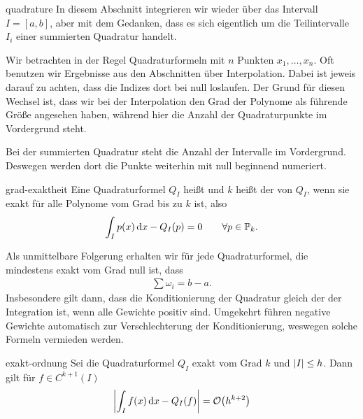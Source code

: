 \begin{Notation}{quadrature}
  In diesem Abschnitt integrieren wir wieder über das Intervall
  $I=[a,b]$, aber mit dem Gedanken, dass es sich eigentlich um die
  Teilintervalle $I_i$ einer summierten Quadratur handelt.

  Wir betrachten in der Regel Quadraturformeln mit $n$ Punkten
  $x_1,\dots,x_n$. Oft benutzen wir Ergebnisse aus den Abschnitten
  über Interpolation. Dabei ist jeweis darauf zu achten, dass die
  Indizes dort bei null loslaufen. Der Grund für diesen Wechsel ist,
  dass wir bei der Interpolation den Grad der Polynome als führende
  Größe angesehen haben, während hier die Anzahl der Quadraturpunkte
  im Vordergrund steht.

  Bei der summierten Quadratur steht die Anzahl der Intervalle im
  Vordergrund. Deswegen werden dort die Punkte weiterhin mit null
  beginnend numeriert.
\end{Notation}

\begin{Definition}{grad-exaktheit}
  Eine Quadraturformel $Q_I$ heißt  und $k$
  heißt der  von $Q_I$, wenn sie exakt für
  alle Polynome vom Grad bis zu $k$ ist, also
  \begin{gather}
    \int_I p(x)\,\mathrm{d} x - Q_{I}(p) = 0 \qquad \forall p\in \mathbb P_k.
  \end{gather}
\end{Definition}

\begin{remark}
  Als unmittelbare Folgerung erhalten wir für jede Quadraturformel,
  die mindestens exakt vom Grad null ist, dass
  \begin{gather}
    \sum \omega_i = b-a.
  \end{gather}
  Insbesondere gilt dann, dass die Konditionierung der Quadratur
  gleich der der Integration ist, wenn alle Gewichte positiv
  sind. Umgekehrt führen negative Gewichte automatisch zur
  Verschlechterung der Konditionierung, weswegen solche Formeln
  vermieden werden.
\end{remark}

\begin{Lemma}{exakt-ordnung}
  Sei die Quadraturformel $Q_I$ exakt vom Grad $k$ und
  $\lvert I\rvert \le h$. Dann gilt für $f\in C^{k+1}(I)$
  \begin{gather}
    \left|\int_{I} f(x)\,\mathrm{d} x - Q_{I}(f)\right| = \mathcal O\bigl(h^{k+2}\bigr)
  \end{gather}
\end{Lemma}

